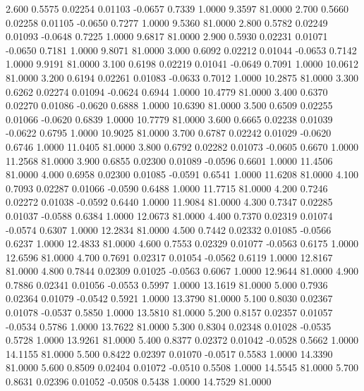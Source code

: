    2.600   0.5575   0.02254   0.01103  -0.0657   0.7339   1.0000   9.3597  81.0000
   2.700   0.5660   0.02258   0.01105  -0.0650   0.7277   1.0000   9.5360  81.0000
   2.800   0.5782   0.02249   0.01093  -0.0648   0.7225   1.0000   9.6817  81.0000
   2.900   0.5930   0.02231   0.01071  -0.0650   0.7181   1.0000   9.8071  81.0000
   3.000   0.6092   0.02212   0.01044  -0.0653   0.7142   1.0000   9.9191  81.0000
   3.100   0.6198   0.02219   0.01041  -0.0649   0.7091   1.0000  10.0612  81.0000
   3.200   0.6194   0.02261   0.01083  -0.0633   0.7012   1.0000  10.2875  81.0000
   3.300   0.6262   0.02274   0.01094  -0.0624   0.6944   1.0000  10.4779  81.0000
   3.400   0.6370   0.02270   0.01086  -0.0620   0.6888   1.0000  10.6390  81.0000
   3.500   0.6509   0.02255   0.01066  -0.0620   0.6839   1.0000  10.7779  81.0000
   3.600   0.6665   0.02238   0.01039  -0.0622   0.6795   1.0000  10.9025  81.0000
   3.700   0.6787   0.02242   0.01029  -0.0620   0.6746   1.0000  11.0405  81.0000
   3.800   0.6792   0.02282   0.01073  -0.0605   0.6670   1.0000  11.2568  81.0000
   3.900   0.6855   0.02300   0.01089  -0.0596   0.6601   1.0000  11.4506  81.0000
   4.000   0.6958   0.02300   0.01085  -0.0591   0.6541   1.0000  11.6208  81.0000
   4.100   0.7093   0.02287   0.01066  -0.0590   0.6488   1.0000  11.7715  81.0000
   4.200   0.7246   0.02272   0.01038  -0.0592   0.6440   1.0000  11.9084  81.0000
   4.300   0.7347   0.02285   0.01037  -0.0588   0.6384   1.0000  12.0673  81.0000
   4.400   0.7370   0.02319   0.01074  -0.0574   0.6307   1.0000  12.2834  81.0000
   4.500   0.7442   0.02332   0.01085  -0.0566   0.6237   1.0000  12.4833  81.0000
   4.600   0.7553   0.02329   0.01077  -0.0563   0.6175   1.0000  12.6596  81.0000
   4.700   0.7691   0.02317   0.01054  -0.0562   0.6119   1.0000  12.8167  81.0000
   4.800   0.7844   0.02309   0.01025  -0.0563   0.6067   1.0000  12.9644  81.0000
   4.900   0.7886   0.02341   0.01056  -0.0553   0.5997   1.0000  13.1619  81.0000
   5.000   0.7936   0.02364   0.01079  -0.0542   0.5921   1.0000  13.3790  81.0000
   5.100   0.8030   0.02367   0.01078  -0.0537   0.5850   1.0000  13.5810  81.0000
   5.200   0.8157   0.02357   0.01057  -0.0534   0.5786   1.0000  13.7622  81.0000
   5.300   0.8304   0.02348   0.01028  -0.0535   0.5728   1.0000  13.9261  81.0000
   5.400   0.8377   0.02372   0.01042  -0.0528   0.5662   1.0000  14.1155  81.0000
   5.500   0.8422   0.02397   0.01070  -0.0517   0.5583   1.0000  14.3390  81.0000
   5.600   0.8509   0.02404   0.01072  -0.0510   0.5508   1.0000  14.5545  81.0000
   5.700   0.8631   0.02396   0.01052  -0.0508   0.5438   1.0000  14.7529  81.0000
